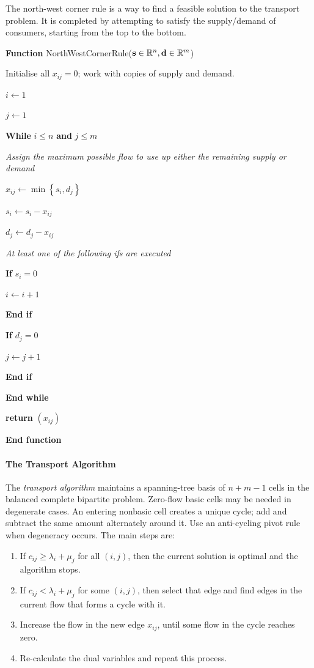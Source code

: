 \documentclass[11pt]{article}
\theoremstyle{definition}
\theoremstyle{remark}
\newcommand{\pqty}[1]{\left(#1\right)}
\newcommand{\Bqty}[1]{\left\{#1\right\}}
\newcommand{\RR}{\mathbb{R}}
\newenvironment{algorithmic}{\begin{list}{}{\setlength{\leftmargin}{1em}\setlength{\itemsep}{2pt}}}{\end{list}}
\newcommand{\State}{\item[]}
\newcommand{\Statex}{\item[]}
\newcommand{\Function}[2]{\item[]\textbf{Function }#1(#2)}
\newcommand{\EndFunction}{\item[]\textbf{End function}}
\newcommand{\Return}{\textbf{return } }
\newcommand{\While}[1]{\item[]\textbf{While }#1}
\newcommand{\EndWhile}{\item[]\textbf{End while}}
\newcommand{\If}[1]{\item[]\textbf{If }#1}
\newcommand{\EndIf}{\item[]\textbf{End if}}
\newcommand{\LComment}[1]{\Statex\textit{#1}}
\begin{document}
The north-west corner rule is a way to find a feasible solution to the transport problem. It is completed by attempting to satisfy the supply/demand of consumers, starting from the top to the bottom.

\begin{algorithm}[ht!]
    \caption{North-West Corner Rule}\label{alg:north-west-corner-rule}%
    \begin{algorithmic}
        \Function{NorthWestCornerRule}{\(\vb{s} \in \RR^n, \vb{d} 
        \in \RR^m\)}
            \State Initialise all \(x_{ij}=0\); work with copies of supply and demand.\State \(i \gets 1\)
            \State \(j \gets 1\)

            \Statex

            \While{\(i \leq n\) \textbf{and} \(j \leq m\)}
                \LComment{Assign the maximum possible flow to use up either the remaining supply or demand}

                \State \(x_{ij} \gets \min \Bqty{s_i, d_j}\)
                \State \(s_i \gets s_i - x_{ij}\)
                \State \(d_j \gets d_j - x_{ij}\)

                \Statex 

                \LComment{At least one of the following ifs are executed}
                
                \If{\(s_i = 0\)}
                    \State \(i \gets i + 1\)
                \EndIf

                \If{\(d_j = 0\)}
                    \State \(j \gets j + 1\)
                \EndIf
            \EndWhile

            \State \Return{\(\pqty{x_{ij}}\)}
        \EndFunction
    \end{algorithmic}
\end{algorithm}

\paragraph{The Transport Algorithm} The \emph{transport algorithm} maintains a spanning-tree basis of \(n+m-1\) cells in the balanced complete bipartite problem. Zero-flow basic cells may be needed in degenerate cases. An entering nonbasic cell creates a unique cycle; add and subtract the same amount alternately around it. Use an anti-cycling pivot rule when degeneracy occurs. The main steps are:
\begin{enumerate}
    \item If \(c_{ij} \geq \lambda_i + \mu_j\) for all \(\pqty{i, j}\), then the current solution is optimal and the algorithm stops.
    \item If \(c_{ij} < \lambda_i + \mu_j\) for some \(\pqty{i, j}\), then select that edge and find edges in the current flow that forms a cycle with it.
    \item Increase the flow in the new edge \(x_{ij}\), until some flow in the cycle reaches zero.
    \item Re-calculate the dual variables and repeat this process.
\end{enumerate}
\end{document}
